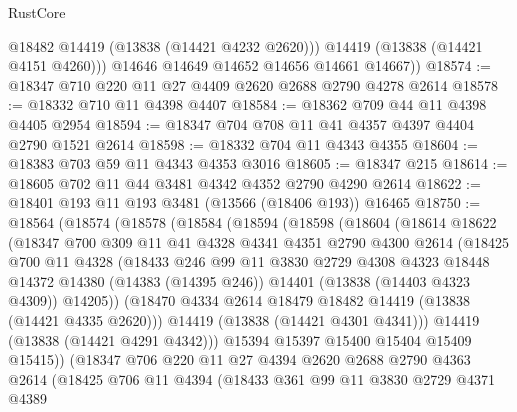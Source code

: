 \begin{lexlean}{RustCore}
\begin{coremodule}
            @18482
            @14419
            (@13838 (@14421 @4232 @2620)))
          @14419
          (@13838 (@14421 @4151 @4260)))
        @14646
        @14649
        @14652
        @14656
        @14661
        @14667))
@18574 := @18347 @710 @220 @11 @27 @4409 @2620 @2688 @2790 @4278 @2614
@18578 := @18332 @710 @11 @4398 @4407
@18584 := @18362 @709 @44 @11 @4398 @4405 @2954
@18594 := @18347 @704 @708 @11 @41 @4357 @4397 @4404 @2790 @1521 @2614
@18598 := @18332 @704 @11 @4343 @4355
@18604 := @18383 @703 @59 @11 @4343 @4353 @3016
@18605 := @18347 @215
@18614 := @18605 @702 @11 @44 @3481 @4342 @4352 @2790 @4290 @2614
@18622 := @18401 @193 @11 @193 @3481 (@13566 (@18406 @193)) @16465
@18750 := @18564
    (@18574
      (@18578
        (@18584
          (@18594
            (@18598
              (@18604
                (@18614
                  @18622
                  (@18347
                    @700
                    @309
                    @11
                    @41
                    @4328
                    @4341
                    @4351
                    @2790
                    @4300
                    @2614
                    (@18425
                      @700
                      @11
                      @4328
                      (@18433
                        @246
                        @99
                        @11
                        @3830
                        @2729
                        @4308
                        @4323
                        @18448
                        @14372
                        @14380
                        (@14383 (@14395 @246))
                        @14401
                        (@13838 (@14403 @4323 @4309))
                        @14205))
                    (@18470 @4334 @2614 @18479 @18482 @14419 (@13838 (@14421 @4335 @2620)))
                    @14419
                    (@13838 (@14421 @4301 @4341)))
                  @14419
                  (@13838 (@14421 @4291 @4342)))
                @15394
                @15397
                @15400
                @15404
                @15409
                @15415))
            (@18347
              @706
              @220
              @11
              @27
              @4394
              @2620
              @2688
              @2790
              @4363
              @2614
              (@18425
                @706
                @11
                @4394
                (@18433
                  @361
                  @99
                  @11
                  @3830
                  @2729
                  @4371
                  @4389

\end{coremodule}
\end{lexlean}
